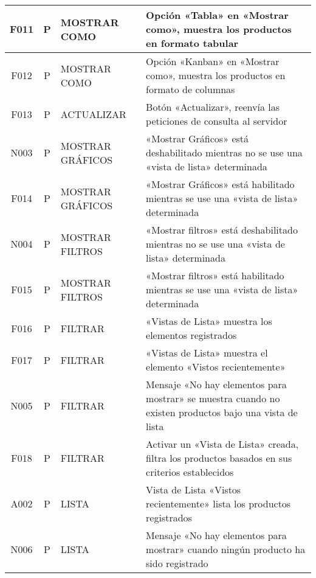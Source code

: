 \begin{landscape}
{\begin{longtable}[htb]{|c|c|p{3.8cm}|p{15.2cm}|}
\scriptsize{F011} & \scriptsize{P} & \scriptsize{MOSTRAR COMO} & \scriptsize{Opción «Tabla» en «Mostrar como», muestra los productos en formato tabular} \\ \hline
\scriptsize{F012} & \scriptsize{P} & \scriptsize{MOSTRAR COMO} & \scriptsize{Opción «Kanban» en «Mostrar como», muestra los productos en formato de columnas} \\ \hline
\scriptsize{F013} & \scriptsize{P} & \scriptsize{ACTUALIZAR} & \scriptsize{Botón «Actualizar», reenvía las peticiones de consulta al servidor} \\ \hline
\scriptsize{N003} & \scriptsize{P} & \scriptsize{MOSTRAR GRÁFICOS} & \scriptsize{«Mostrar Gráficos» está deshabilitado mientras no se use una «vista de lista» determinada} \\ \hline
\scriptsize{F014} & \scriptsize{P} & \scriptsize{MOSTRAR GRÁFICOS} & \scriptsize{«Mostrar Gráficos» está habilitado mientras se use una «vista de lista» determinada} \\ \hline
\scriptsize{N004} & \scriptsize{P} & \scriptsize{MOSTRAR FILTROS} & \scriptsize{«Mostrar filtros» está deshabilitado mientras no se use una «vista de lista» determinada} \\ \hline
\scriptsize{F015} & \scriptsize{P} & \scriptsize{MOSTRAR FILTROS} & \scriptsize{«Mostrar filtros» está habilitado mientras se use una «vista de lista» determinada} \\ \hline
\scriptsize{F016} & \scriptsize{P} & \scriptsize{FILTRAR} & \scriptsize{«Vistas de Lista» muestra los elementos registrados} \\ \hline
\scriptsize{F017} & \scriptsize{P} & \scriptsize{FILTRAR} & \scriptsize{«Vistas de Lista» muestra el elemento «Vistos recientemente»} \\ \hline
\scriptsize{N005} & \scriptsize{P} & \scriptsize{FILTRAR} & \scriptsize{Mensaje «No hay elementos para mostrar» se muestra cuando no existen productos bajo una vista de lista} \\ \hline
\scriptsize{F018} & \scriptsize{P} & \scriptsize{FILTRAR} & \scriptsize{Activar un «Vista de Lista» creada, filtra los productos basados en sus criterios establecidos} \\ \hline
\scriptsize{A002} & \scriptsize{P} & \scriptsize{LISTA} & \scriptsize{Vista de Lista «Vistos recientemente» lista los productos registrados} \\ \hline
\scriptsize{N006} & \scriptsize{P} & \scriptsize{LISTA} & \scriptsize{Mensaje «No hay elementos para mostrar» cuando ningún producto ha sido registrado} \\ \hline

\end{longtable}}
\end{landscape}
